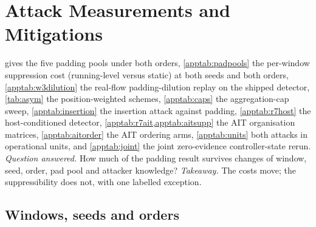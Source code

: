 \documentclass[conference]{IEEEtran}
\begin{document}









\section{Attack Measurements and Mitigations}\label{app:attacks}

 gives the five padding pools under both orders, \cref{apptab:padpools} the per-window
suppression cost (running-level versus static) at both seeds and both orders, \cref{apptab:w3dilution}
the real-flow padding-dilution replay on the shipped detector, \cref{tab:asym} the position-weighted
schemes, \cref{apptab:caps} the aggregation-cap sweep, \cref{apptab:insertion} the insertion attack
against padding, \cref{apptab:r7host} the host-conditioned detector, \cref{apptab:r7ait,apptab:aitsupp}
the AIT organisation matrices, \cref{apptab:aitorder} the AIT ordering arms, \cref{apptab:units}
both attacks in operational units, and \cref{apptab:joint} the joint zero-evidence controller-state rerun. \emph{Question answered.} How much of the
padding result survives changes of window, seed, order, pad pool and attacker knowledge?
\emph{Takeaway.} The costs move; the suppressibility does not, with one labelled exception.

\subsection{Windows, seeds and orders}\label{app:padwindows}
\end{document}
